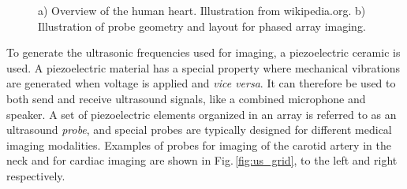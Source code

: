 \begin{figure}
\centering
{}
\caption{a) Overview of the human heart. Illustration from wikipedia.org. b) Illustration of probe geometry and layout for phased array imaging.}
\end{figure}


To generate the ultrasonic frequencies used for imaging, a piezoelectric ceramic is used. A piezoelectric material has a special property where mechanical vibrations are generated when voltage is applied and \textit{vice versa}. It can therefore be used to both send and receive ultrasound signals, like a combined microphone and speaker. A set of piezoelectric elements organized in an array is referred to as an ultrasound \textit{probe}, and special probes are typically designed for different medical imaging modalities. Examples of probes for imaging of the carotid artery in the neck and for cardiac imaging are shown in Fig.\,\ref{fig:us_grid}, to the left and right respectively. %

